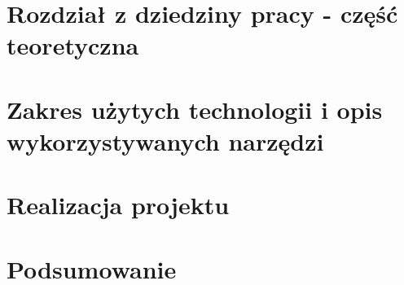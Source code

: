 \section{Rozdział z dziedziny pracy - część teoretyczna}

\newpage

\section{Zakres użytych technologii i opis wykorzystywanych narzędzi}

\newpage

\section{Realizacja projektu}

\newpage

\section{Podsumowanie}

\newpage